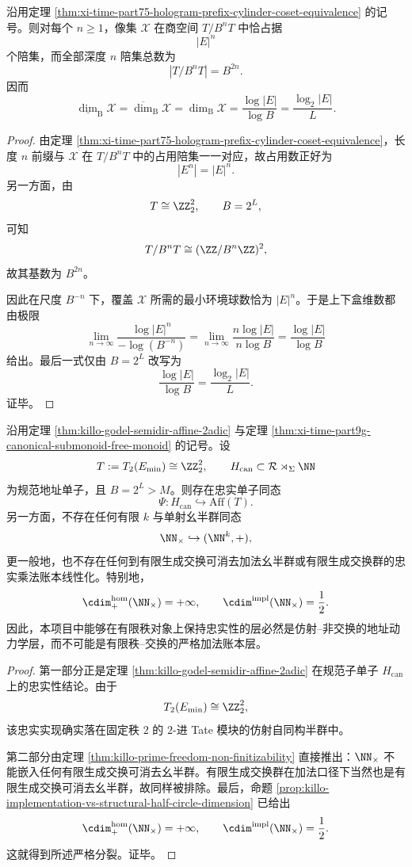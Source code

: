 \begin{corollary}[全息地址像集的商占用计数与精确盒维数]\label{cor:xi-time-part75-hologram-image-quotient-box-dimension}
沿用定理 \ref{thm:xi-time-part75-hologram-prefix-cylinder-coset-equivalence} 的记号。则对每个 \(n\ge 1\)，像集 \(\mathcal X\) 在商空间 \(T/B^nT\) 中恰占据
\[
|E|^n
\]
个陪集，而全部深度 \(n\) 陪集总数为
\[
|T/B^nT|=B^{2n}.
\]
因而
\[
\underline{\dim}_{\mathrm B}\mathcal X
=
\overline{\dim}_{\mathrm B}\mathcal X
=
\dim_{\mathrm B}\mathcal X
=
\frac{\log |E|}{\log B}
=
\frac{\log_2|E|}{L}.
\]
\end{corollary}
\begin{proof}
由定理 \ref{thm:xi-time-part75-hologram-prefix-cylinder-coset-equivalence}，长度 \(n\) 前缀与 \(\mathcal X\) 在 \(T/B^nT\) 中的占用陪集一一对应，故占用数正好为
\[
|E^n|=|E|^n.
\]
另一方面，由
\[
T\cong \ZZ_2^2,
\qquad
B=2^L,
\]
可知
\[
T/B^nT\cong (\ZZ/B^n\ZZ)^2,
\]
故其基数为 \(B^{2n}\)。

因此在尺度 \(B^{-n}\) 下，覆盖 \(\mathcal X\) 所需的最小环境球数恰为 \(|E|^n\)。于是上下盒维数都由极限
\[
\lim_{n\to\infty}\frac{\log |E|^n}{-\log(B^{-n})}
=
\lim_{n\to\infty}\frac{n\log|E|}{n\log B}
=
\frac{\log|E|}{\log B}
\]
给出。最后一式仅由 \(B=2^L\) 改写为
\[
\frac{\log|E|}{\log B}=\frac{\log_2|E|}{L}.
\]
证毕。
\end{proof}

\begin{theorem}[有限维忠实实现的仿射必然性]\label{thm:xi-time-part75-faithful-finite-dimensional-realization-affine-necessity}
沿用定理 \ref{thm:killo-godel-semidir-affine-2adic} 与定理 \ref{thm:xi-time-part9g-canonical-submonoid-free-monoid} 的记号。设
\[
T:=T_2(E_{\min})\cong \ZZ_2^2,
\qquad
H_{\mathrm{can}}\subset \mathcal R\rtimes_{\Sigma}\NN
\]
为规范地址单子，且 \(B=2^L>M\)。则存在忠实单子同态
\[
\Psi:H_{\mathrm{can}}\hookrightarrow \mathrm{Aff}(T).
\]
另一方面，不存在任何有限 \(k\) 与单射幺半群同态
\[
\NN_{\times}\hookrightarrow (\NN^k,+),
\]
更一般地，也不存在任何到有限生成交换可消去加法幺半群或有限生成交换群的忠实乘法账本线性化。特别地，
\[
\cdim^{\mathrm{hom}}_{+}(\NN_{\times})=+\infty,
\qquad
\cdim^{\mathrm{impl}}(\NN_{\times})=\frac12.
\]
因此，本项目中能够在有限秩对象上保持忠实性的层必然是仿射--非交换的地址动力学层，而不可能是有限秩--交换的严格加法账本层。
\end{theorem}
\begin{proof}
第一部分正是定理 \ref{thm:killo-godel-semidir-affine-2adic} 在规范子单子 \(H_{\mathrm{can}}\) 上的忠实性结论。由于
\[
T_2(E_{\min})\cong \ZZ_2^2,
\]
该忠实实现确实落在固定秩 \(2\) 的 \(2\)-进 Tate 模块的仿射自同构半群中。

第二部分由定理 \ref{thm:killo-prime-freedom-non-finitizability} 直接推出：\(\NN_{\times}\) 不能嵌入任何有限生成交换可消去幺半群。有限生成交换群在加法口径下当然也是有限生成交换可消去幺半群，故同样被排除。最后，命题 \ref{prop:killo-implementation-vs-structural-half-circle-dimension} 已给出
\[
\cdim^{\mathrm{hom}}_{+}(\NN_{\times})=+\infty,
\qquad
\cdim^{\mathrm{impl}}(\NN_{\times})=\frac12.
\]
这就得到所述严格分裂。证毕。
\end{proof}

